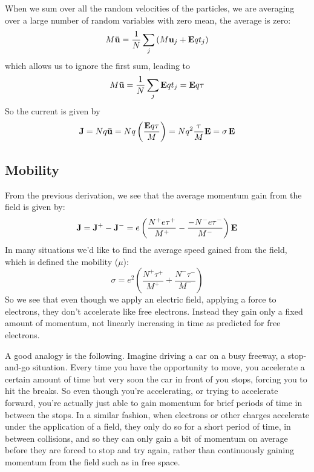 When we sum over all the random velocities of the particles, we are averaging over a large number of random variables with zero mean, the average is zero:
 \begin{equation}
	M{\bf{\bar u}} = \frac{1}{N}\sum\limits_j {\left( {M{{\bf{u}}_j} + {\bf{E}}q{t_j}} \right)} 
\end{equation}
which allows us to ignore the first sum, leading to
\begin{equation}
	M{\bf{\bar u}} = \frac{1}{N}\sum\limits_j {{\bf{E}}q{t_j}}  = {\bf{E}}q\tau 
\end{equation}
So the current is given by
\begin{equation} {\bf{J}} = Nq{\bf{\bar u}} = Nq\left( {\frac{{{\bf{E}}q\tau }}{M}} \right) = N{q^2}\frac{\tau }{M}{\bf{E}} = \sigma \,{\bf{E}}
\end{equation}




\subsection{Mobility}

 From the previous derivation, we see that the average momentum gain from the field is given by:
\begin{equation}
	{\bf{J}} = {{\bf{J}}^ + } - {{\bf{J}}^ - } = e\left( {\frac{{{N^ + }e{\tau ^ + }}}{{{M^ + }}} - \frac{{ - {N^ - }e{\tau ^ - }}}{{{M^ - }}}} \right){\bf{E}}
\end{equation}
In many situations we’d like to find the average speed gained from the field, which is defined the mobility ($\mu$):
\begin{equation}
	\sigma  = {e^2}\left( {\frac{{{N^ + }{\tau ^ + }}}{{{M^ + }}} + \frac{{{N^ - }{\tau ^ - }}}{{{M^ - }}}} \right)
\end{equation}
So we see that even though we apply an electric field, applying a force to electrons, they don't accelerate like free electrons.  Instead they gain only a fixed amount of momentum, not linearly increasing in time as predicted for free electrons.

A good analogy is the following.  Imagine driving a car on a busy freeway, a stop-and-go situation.  Every time you have the opportunity to move, you accelerate a certain amount of time but very soon the car in front of you stops, forcing you to hit the breaks.  So even though you're accelerating, or trying to accelerate forward, you're actually just able to gain momentum for brief periods of time in between the stops.  In a similar fashion, when electrons or other charges accelerate under the application of a field, they only do so for a short period of time, in between collisions, and so they can only gain a bit of  momentum on average before they are forced to stop and try again, rather than continuously gaining momentum from the field such as in free space.

